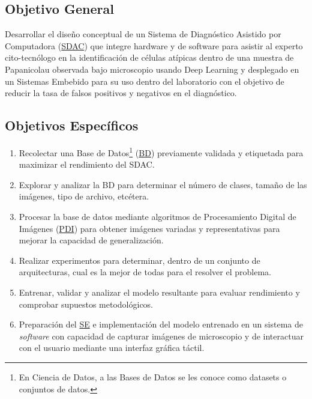 \subsection{Objetivo General}

Desarrollar el diseño conceptual de un Sistema de Diagnóstico Asistido por
Computadora (\hyperlink{abbr}{SDAC}) que integre hardware y de software para asistir al
experto cito-tecnólogo en la identificación de células atípicas dentro de una
muestra de Papanicolau observada bajo microscopio usando Deep Learning y
desplegado en un Sistemas Embebido para su uso dentro del laboratorio con el
objetivo de reducir la tasa de falsos positivos y negativos en el diagnóstico.

\subsection{Objetivos Específicos}

\begin{enumerate}
    \item Recolectar una Base de Datos\footnote{En Ciencia de Datos, a las Bases de Datos se les conoce como datasets o conjuntos de datos.} (\hyperlink{abbr}{BD}) previamente validada y etiquetada para maximizar el rendimiento
    del SDAC.
    \item Explorar y analizar la BD para determinar el número de clases, tamaño
    de las imágenes, tipo de archivo, etcétera. 
    \item Procesar la base de datos mediante algoritmos de Procesamiento Digital
    de Imágenes (\hyperlink{abbr}{PDI}) para obtener imágenes variadas y representativas para mejorar
    la capacidad de generalización.
    \item Realizar experimentos para determinar, dentro de un conjunto de
    arquitecturas, cual es la mejor de todas para el resolver el problema.
    \item Entrenar, validar y analizar el modelo resultante para evaluar
    rendimiento y comprobar supuestos metodológicos.
    \item Preparación del \hyperlink{abbr}{SE} e implementación del modelo
    entrenado en un sistema de \emph{software} con capacidad de capturar
    imágenes de microscopio y de interactuar con el usuario mediante una
    interfaz gráfica táctil.
\end{enumerate}